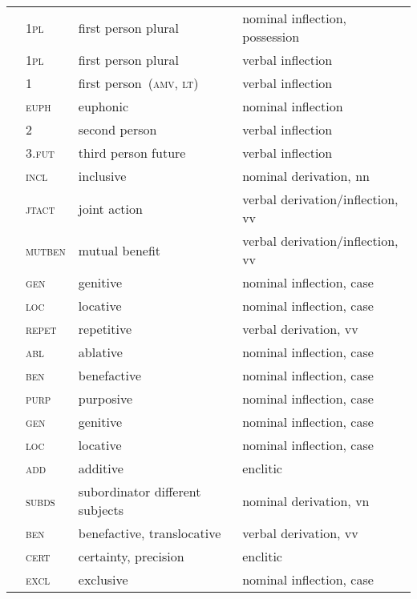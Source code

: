 \begin{refsection}
\begin{small}
\begin{longtable}{*{4}{@{\hspace{0.75ex}}l}@{\hspace{0ex}}}
 	& 1\textsc{pl} 	& first person plural 	& nominal inflection, possession\\
 	& 1\textsc{pl} 	& first person plural 	& verbal inflection\\
 	& 1 	& first person~(\textsc{amv}, \textsc{lt}) 	& verbal inflection\\
 	& \textsc{euph} 		& euphonic 	& nominal inflection\\
 		& 2 	& second person 	& verbal inflection\\
		& 3.\textsc{fut} 	& third person future 	& verbal inflection\\
 		& \textsc{incl} 	& inclusive 	& nominal derivation, nn\\
 		& \textsc{jtact} 	& joint action 	& verbal derivation/inflection, vv \\
 		& \textsc{mutben} 	& mutual benefit 	& verbal derivation/inflection, vv \\
 	& \textsc{gen} 	& genitive 	& nominal inflection, case\\
 	& \textsc{loc} 	& locative 	& nominal inflection, case\\
 	& \textsc{repet} 	& repetitive 	& verbal derivation, vv\\
 	& \textsc{abl} 		& ablative 	& nominal inflection, case\\
 	& \textsc{ben} 		& benefactive 	& nominal inflection, case\\
 	& \textsc{purp} 		& purposive 	& nominal inflection, case\\
 	& \textsc{gen} 	& genitive 	& nominal inflection, case\\
 	& \textsc{loc} 	& locative 	& nominal inflection, case\\
 		& \textsc{add} 		& additive 	& enclitic\\
		& \textsc{subds} 	& subordinator different subjects 	& nominal derivation, vn\\
		& \textsc{ben} 	& benefactive, translocative 	& verbal derivation, vv\\
 		& \textsc{cert} 		& certainty, precision 	& enclitic\\
 		& \textsc{excl} 		& exclusive 	& nominal inflection, case\\

\end{longtable}
\end{small}
\end{refsection}
